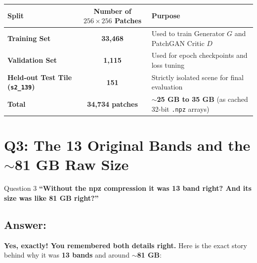 \documentclass[11pt,a4paper]{article}
\begin{document}
\begin{center}
\begin{tabularx}{\textwidth}{lcX}
\toprule
\textbf{Split} & \textbf{Number of $256 \times 256$ Patches} & \textbf{Purpose} \\
\midrule
\textbf{Training Set} & \textbf{33,468} & Used to train Generator $G$ and PatchGAN Critic $D$ \\
\textbf{Validation Set} & \textbf{1,115} & Used for epoch checkpoints and loss tuning \\
\textbf{Held-out Test Tile (\texttt{s2\_139})} & \textbf{151} & Strictly isolated scene for final evaluation \\
\midrule
\textbf{Total} & \textbf{34,734 patches} & \textbf{$\sim$25 GB to 35 GB} (as cached 32-bit \texttt{.npz} arrays) \\
\bottomrule
\end{tabularx}
\end{center}

\bigskip

\section{Q3: The 13 Original Bands and the $\sim$81 GB Raw Size}

\begin{questionbox}{Question 3}
\textbf{``Without the npz compression it was 13 band right? And its size was like 81 GB right?''}
\end{questionbox}

\subsection*{Answer:}
\textbf{Yes, exactly! You remembered both details right.} Here is the exact story behind why it was \textbf{13 bands} and around \textbf{$\sim$81 GB}:
\end{document}
